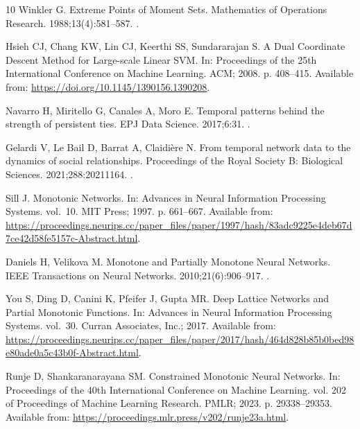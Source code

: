\documentclass[pdflatex,sn-vancouver-num]{sn-jnl}
\theoremstyle{thmstyleone}
\begin{document}
\begin{thebibliography}{10}
Winkler G.
\newblock Extreme Points of Moment Sets.
\newblock Mathematics of Operations Research. 1988;13(4):581--587.
\newblock {}.

Hsieh CJ, Chang KW, Lin CJ, Keerthi SS, Sundararajan S.
\newblock A Dual Coordinate Descent Method for Large-scale Linear {SVM}.
\newblock In: Proceedings of the 25th International Conference on Machine
  Learning. ACM; 2008. p. 408--415.
\newblock Available from: \url{https://doi.org/10.1145/1390156.1390208}.

Navarro H, Miritello G, Canales A, Moro E.
\newblock Temporal patterns behind the strength of persistent ties.
\newblock EPJ Data Science. 2017;6:31.
\newblock {}.

Gelardi V, {Le Bail} D, Barrat A, Claidi{\`e}re N.
\newblock From temporal network data to the dynamics of social relationships.
\newblock Proceedings of the Royal Society B: Biological Sciences.
  2021;288:20211164.
\newblock {}.

Sill J.
\newblock Monotonic Networks.
\newblock In: Advances in Neural Information Processing Systems. vol.~10. MIT
  Press; 1997. p. 661--667.
\newblock Available from:
  \url{https://proceedings.neurips.cc/paper_files/paper/1997/hash/83adc9225e4deb67d7ce42d58fe5157c-Abstract.html}.

Daniels H, Velikova M.
\newblock Monotone and Partially Monotone Neural Networks.
\newblock IEEE Transactions on Neural Networks. 2010;21(6):906--917.
\newblock {}.

You S, Ding D, Canini K, Pfeifer J, Gupta MR.
\newblock Deep Lattice Networks and Partial Monotonic Functions.
\newblock In: Advances in Neural Information Processing Systems. vol.~30.
  Curran Associates, Inc.; 2017. Available from:
  \url{https://proceedings.neurips.cc/paper_files/paper/2017/hash/464d828b85b0bed98e80ade0a5c43b0f-Abstract.html}.

Runje D, Shankaranarayana SM.
\newblock Constrained Monotonic Neural Networks.
\newblock In: Proceedings of the 40th International Conference on Machine
  Learning. vol. 202 of Proceedings of Machine Learning Research. PMLR; 2023.
  p. 29338--29353.
\newblock Available from:
  \url{https://proceedings.mlr.press/v202/runje23a.html}.


\end{thebibliography}
\end{document}
